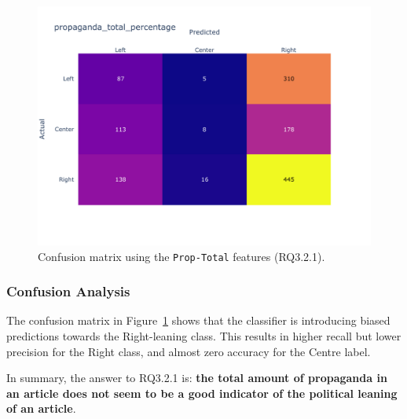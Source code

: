 \begin{figure}[!htbp]
    \centering
    \includegraphics[trim={0.9cm 2cm 0.9cm 1cm},clip,width=0.75\linewidth]{figures/baly_media_confusion_matrix_propaganda_total_percentage.pdf}
    \caption{Confusion matrix using the \texttt{Prop-Total} features (RQ3.2.1).}
    \label{fig:total_prop_confusion}
\end{figure}

\subsubsection{Confusion Analysis}

The confusion matrix in Figure~\ref{fig:total_prop_confusion} shows that the classifier is introducing biased predictions towards the Right-leaning class. %
This results in higher recall but lower precision for the Right class, and almost zero accuracy for the Centre label.

In summary, the answer to RQ3.2.1 is: \textbf{the total amount of propaganda in an article does not seem to be a good indicator of the political leaning of an article}.


